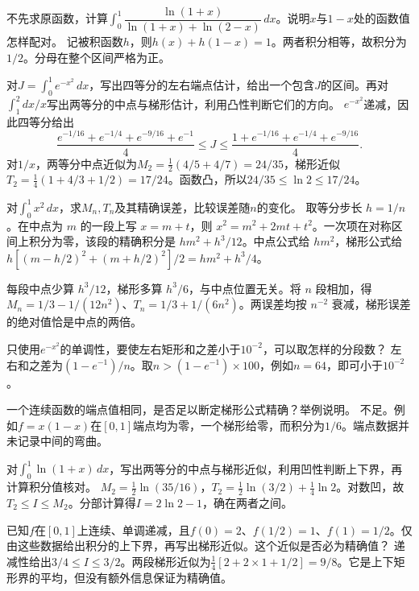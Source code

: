 不先求原函数，计算\(\int_0^1\dfrac{\ln(1+x)}{\ln(1+x)+\ln(2-x)}\,dx\)。说明\(x\)与\(1-x\)处的函数值怎样配对。
\solutionanswer
记被积函数\(h\)，则\(h(x)+h(1-x)=1\)。两者积分相等，故积分为\(1/2\)。分母在整个区间严格为正。


对\(J=\int_0^1e^{-x^2}\,dx\)，写出四等分的左右端点估计，给出一个包含\(J\)的区间。再对\(\int_1^2dx/x\)写出两等分的中点与梯形估计，利用凸性判断它们的方向。
\solutionanswer
\(e^{-x^2}\)递减，因此四等分给出
\[
 \frac{e^{-1/16}+e^{-1/4}+e^{-9/16}+e^{-1}}4\le J\le
 \frac{1+e^{-1/16}+e^{-1/4}+e^{-9/16}}4.
\]
对\(1/x\)，两等分中点近似为\(M_2=\tfrac12(4/5+4/7)=24/35\)，梯形近似\(T_2=\tfrac14(1+4/3+1/2)=17/24\)。函数凸，所以\(24/35\le\ln2\le17/24\)。


对\(\int_0^1x^2\,dx\)，求\(M_n,T_n\)及其精确误差，比较误差随\(n\)的变化。
\solutionanswer
取等分步长 \(h=1/n\)。在中点为 \(m\) 的一段上写 \(x=m+t\)，则 \(x^2=m^2+2mt+t^2\)。一次项在对称区间上积分为零，该段的精确积分是 \(hm^2+h^3/12\)。中点公式给 \(hm^2\)，梯形公式给 \(h[(m-h/2)^2+(m+h/2)^2]/2=hm^2+h^3/4\)。

每段中点少算 \(h^3/12\)，梯形多算 \(h^3/6\)，与中点位置无关。将 \(n\) 段相加，得 \(M_n=1/3-1/(12n^2)\)、\(T_n=1/3+1/(6n^2)\)。两误差均按 \(n^{-2}\) 衰减，梯形误差的绝对值恰是中点的两倍。


只使用\(e^{-x^2}\)的单调性，要使左右矩形和之差小于\(10^{-2}\)，可以取怎样的分段数？
\solutionanswer
左右和之差为\((1-e^{-1})/n\)。取\(n>(1-e^{-1})\times100\)，例如\(n=64\)，即可小于\(10^{-2}\)。


一个连续函数的端点值相同，是否足以断定梯形公式精确？举例说明。
\solutionanswer
不足。例如\(f=x(1-x)\)在\([0,1]\)端点均为零，一个梯形给零，而积分为\(1/6\)。端点数据并未记录中间的弯曲。


对\(\int_0^1\ln(1+x)\,dx\)，写出两等分的中点与梯形近似，利用凹性判断上下界，再计算积分值核对。
\solutionanswer
\(M_2=\frac12\ln(35/16)\)，\(T_2=\frac12\ln(3/2)+\frac14\ln2\)。对数凹，故\(T_2\le I\le M_2\)。分部计算得\(I=2\ln2-1\)，确在两者之间。


已知\(f\)在\([0,1]\)上连续、单调递减，且\(f(0)=2\)、\(f(1/2)=1\)、\(f(1)=1/2\)。仅由这些数据给出积分的上下界，再写出梯形近似。这个近似是否必为精确值？
\solutionanswer
递减性给出\(3/4\le I\le3/2\)。两段梯形近似为\(\frac14[2+2\times1+1/2]=9/8\)。它是上下矩形界的平均，但没有额外信息保证为精确值。


